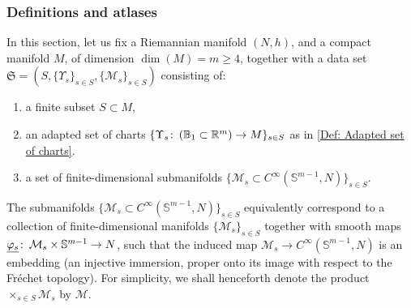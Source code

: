 \documentclass{article}
\numberwithin{equation}{section}        %
\theoremstyle{bfnote}
\theoremstyle{definition}
\theoremstyle{bfremark}
\newcommand{\col}{\colon \thinspace}        %
\newcommand{\Ball}{\mathbb{B}}              %
\newcommand{\Sp}{\mathbb{S}}                %
\begin{document}
    \subsubsection{Definitions and atlases}     \label{subsubsec: Definitions and atlases}

In this section, let us fix a Riemannian manifold $(N,h)$, and a compact manifold $M$, of dimension $\dim(M) = m \geq 4$, together with a data set $\mathfrak{S} = (S,\{\Upsilon_s\}_{s \in S},\{\mathcal{M}_s\}_{s\in S})$ consisting of:
\begin{enumerate}
    \item a finite subset $S \subset M$,
    \item an adapted set of charts $\{\Upsilon_s \col (\Ball_1 \subset\mathbb{R}^m) \to M\}_{s\in S}$ as in \cref{Def: Adapted set of charts}.
    \item a set of finite-dimensional submanifolds $\{\mathcal{M}_s \subset C^\infty(\Sp^{m-1},N)\}_{s \in S}$.
\end{enumerate} 
The submanifolds $\{\mathcal{M}_s\subset C^\infty(\Sp^{m-1},N)\}_{s \in S}$ equivalently correspond to a collection of finite-dimensional manifolds $\{\mathcal{M}_s\}_{s \in S}$ together with smooth maps $\underline{\varphi_s } \col \mathcal{M}_s \times \Sp^{m-1} \to N$, such that the induced map $\mathcal{M}_s \to C^\infty(\Sp^{m-1},N)$ is an embedding (an injective immersion, proper onto its image with respect to the Fr\'echet topology). For simplicity, we shall henceforth denote the product $\times_{s \in S} \mathcal{M}_s$ by $\mathcal{M}$.
\end{document}
